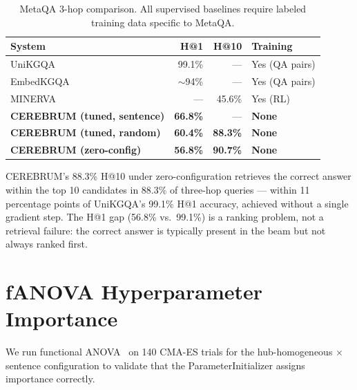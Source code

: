 \documentclass[11pt,a4paper]{article}
\begin{document}
\begin{table}[t]
\centering
\caption{MetaQA 3-hop comparison. All supervised baselines require labeled
training data specific to MetaQA.}
\label{tab:comparison}
\begin{tabular}{lrrl}
\toprule
\textbf{System} & \textbf{H@1} & \textbf{H@10} & \textbf{Training} \\
\midrule
UniKGQA~\cite{jiang2023unikgqa}          & 99.1\% & ---   & Yes (QA pairs) \\
EmbedKGQA~\cite{saxena2020improving}     & $\sim$94\% & --- & Yes (QA pairs) \\
MINERVA~\cite{das2018go}                 & ---    & 45.6\% & Yes (RL) \\
\midrule
\textbf{CEREBRUM (tuned, sentence)}      & \textbf{66.8\%} & --- & \textbf{None} \\
\textbf{CEREBRUM (tuned, random)}        & \textbf{60.4\%} & \textbf{88.3\%} & \textbf{None} \\
\textbf{CEREBRUM (zero-config)}          & \textbf{56.8\%} & \textbf{90.7\%} & \textbf{None} \\
\bottomrule
\end{tabular}
\end{table}

CEREBRUM's 88.3\% H@10 under zero-configuration retrieves the correct
answer within the top 10 candidates in 88.3\% of three-hop queries ---
within 11 percentage points of UniKGQA's 99.1\% H@1 accuracy, achieved
without a single gradient step.
The H@1 gap (56.8\% vs.\ 99.1\%) is a ranking problem, not a retrieval
failure: the correct answer is typically present in the beam but not always
ranked first.

\section{fANOVA Hyperparameter Importance}
\label{sec:fananova}

We run functional ANOVA~\cite{hutter2014efficient} on 140 CMA-ES trials
for the hub-homogeneous $\times$ sentence configuration to validate that
the ParameterInitializer assigns importance correctly.
\end{document}
